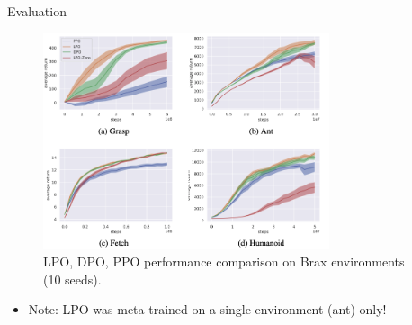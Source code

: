 \documentclass[9pt]{beamer}
\begin{document}
\begin{frame}{Evaluation}

  \begin{figure}
    \centering
    \includegraphics[width=0.75\textwidth]{figures/results3_plots.png}
    \caption{LPO, DPO, PPO performance comparison \cite{dpo2022} on Brax \cite{brax2021github} environments (10 seeds).}
    \label{fig:trl7}
  \end{figure}

\pause
  \begin{itemize}
    \item Note: LPO was meta-trained on a single environment (ant) only!
\end{itemize}
\vfill

\end{frame}
\end{document}
